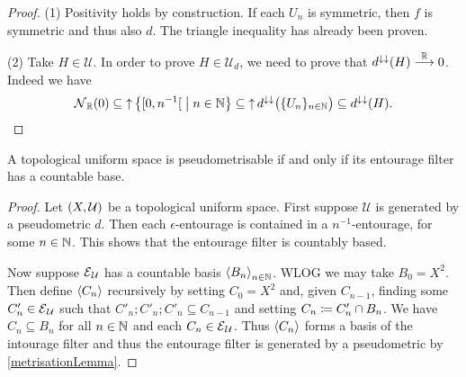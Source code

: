 \begin{proof}
(1) Positivity holds by construction. If each $U_n$ is symmetric, then $f$ is symmetric and thus also $d$. The triangle inequality has already been proven.

(2) Take $H\in \mathcal{U}$. In order to prove $H\in \mathcal{U}_d$, we need to prove that $d^{\downarrow\downarrow}(H)\overset{\mathbb{R}}{\longrightarrow} 0$. Indeed we have
\[ \neighbourhood_\R(0) \subseteq \upset \setbuilder{\interval[co]{0, n^{-1}}}{n\in \N} \subseteq \upset d^{\imf\imf}\big(\{U_n\}_{n\in\N}\big) \subseteq d^{\imf\imf}(H). \]
\end{proof}

\begin{theorem}
A topological uniform space is pseudometrisable \textup{if and only if} its entourage filter has a countable base.
\end{theorem}
\begin{proof}
Let $\sSet{X,\mathcal{U}}$ be a topological uniform space. First suppose $\mathcal{U}$ is generated by a pseudometric $d$. Then each $\epsilon$-entourage is contained in a $n^{-1}$-entourage, for some $n\in \mathbb{N}$. This shows that the entourage filter is countably based.

Now suppose $\operatorname{\mathcal{E}}_\mathcal{U}$ has a countable basis $\left\langle B_n \right\rangle_{n\in \mathbb{N}}$. WLOG we may take $B_0 = X^2$. Then define $\left\langle C_n \right\rangle$ recursively by setting $C_0 = X^2$ and, given $C_{n-1}$, finding some $C'_{n}\in \operatorname{\mathcal{E}}_\mathcal{U}$ such that $C'_{n};C'_{n};C'_{n} \subseteq C_{n-1}$ and setting $C_n \coloneqq C'_n \cap B_n$. We have $C_n\subseteq B_n$ for all $n\in \mathbb{N}$ and each $C_n\in \operatorname{\mathcal{E}}_\mathcal{U}$. Thus $\left\langle C_n \right\rangle$ forms a basis of the intourage filter and thus the entourage filter is generated by a pseudometric by \ref{metrisationLemma}. 
\end{proof}

